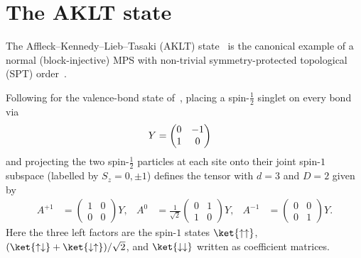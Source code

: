 \section{The AKLT state}\label{sec:aklt}

The Affleck--Kennedy--Lieb--Tasaki (AKLT)
state~\cite{AKLT1987Rigorous,AKLT1988ValenceBond} is the canonical
example of a normal (block-injective) MPS with non-trivial
symmetry-protected topological (SPT)
order~\cite{PerezGarcia2008StringOrder,Schuch2011Phases,Cirac2021Matrix}.

\begin{definition}\label{def:aklt_tensor_review}
    \leanok
    Following \cite[Appendix~A, ``The AKLT state'']{Cirac2021Matrix} for the
    valence-bond state of~\cite{AKLT1987Rigorous}, placing a spin-$\tfrac12$
    singlet on every bond via
    \begin{align}
        Y & = \begin{pmatrix}0&-1\\1&0\end{pmatrix}
        \notag
    \end{align}
    and projecting the two spin-$\tfrac12$ particles at each site onto their
    joint spin-$1$ subspace (labelled by $S_z=0,\pm1$) defines the tensor with
    $d=3$ and $D=2$ given by
    \begin{align}
        A^{+1} & = \begin{pmatrix}1&0\\0&0\end{pmatrix}Y,
               & A^{0}                                    & = \frac{1}{\sqrt2}\begin{pmatrix}0&1\\1&0\end{pmatrix}Y,
               & A^{-1}                                   & = \begin{pmatrix}0&0\\0&1\end{pmatrix}Y.
        \label{eq:aklt_review_tensor}
    \end{align}
    Here the three left factors are the spin-$1$ states $\ket{\uparrow\uparrow}$,
    $(\ket{\uparrow\downarrow}+\ket{\downarrow\uparrow})/\sqrt2$, and
    $\ket{\downarrow\downarrow}$ written as coefficient matrices.
\end{definition}

